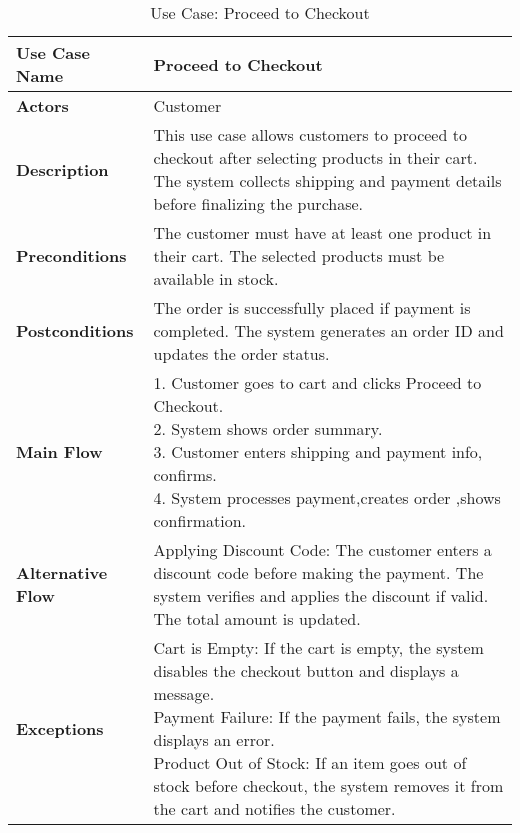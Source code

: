 \begin{table}[h]
\centering
\renewcommand{\arraystretch}{1.2}
\begin{tabular}{|p{3cm}|p{10cm}|}
\hline
\textbf{Use Case Name} & Proceed to Checkout \\
\hline
\textbf{Actors} & Customer \\
\hline
\textbf{Description} & This use case allows customers to proceed to checkout after selecting products in their cart. The system collects shipping and payment details before finalizing the purchase. \\
\hline
\textbf{Preconditions} & The customer must have at least one product in their cart. The selected products must be available in stock. \\
\hline
\textbf{Postconditions} & The order is successfully placed if payment is completed. The system generates an order ID and updates the order status. \\
\hline
\textbf{Main Flow} & \makecell[l]{1. Customer goes to cart and clicks Proceed to Checkout. \\ 2. System shows order summary. \\ 3. Customer enters shipping and payment info, confirms. \\ 4. System processes payment,creates order ,shows confirmation.} \\
\hline
\textbf{Alternative Flow} & \parbox[t]{10cm}{Applying Discount Code: The customer enters a discount code before making the payment. The system verifies and applies the discount if valid. The total amount is updated.} \\
\hline
\textbf{Exceptions} & \parbox[t]{10cm}{Cart is Empty: If the cart is empty, the system disables the checkout button and displays a message. \\ Payment Failure: If the payment fails, the system displays an error. \\ Product Out of Stock: If an item goes out of stock before checkout, the system removes it from the cart and notifies the customer.} \\
\hline
\end{tabular}
\caption{Use Case: Proceed to Checkout}
\end{table}


